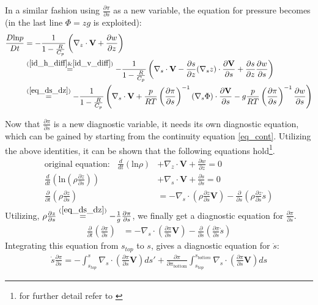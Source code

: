 In a similar fashion using $\frac{\partial \pi}{\partial s}$ as a new variable, the equation for pressure becomes (in the last line $\Phi = zg$ is exploited):
\begin{align*}
\frac{D\text{ln}p}{Dt} &= -\frac{1}{1- \frac{R}{C_p}} \left(\nabla_z \cdot \textbf{V} + \frac{\partial w}{\partial z}\right)\\
&\stackrel{(\ref{id_h_diff} \& \ref{id_v_diff})}{=} -\frac{1}{1- \frac{R}{C_p}} \left(\nabla _s \cdot \textbf{V} - \frac{\partial s}{\partial z} (\nabla _sz)\cdot \frac{\partial \textbf{V}}{\partial s} + \frac{\partial s}{\partial z}\frac{\partial w}{\partial s}\right)\\
&\stackrel{(\ref{eq_ds_dz})}{=} -\frac{1}{1- \frac{R}{C_p}} \left(\nabla _s \cdot \textbf{V} + \frac{p}{RT}\left(\frac{\partial \pi}{\partial s}\right)^{-1} (\nabla _s \Phi)\cdot\frac{\partial \textbf{V}}{\partial s} - g\frac{p}{RT}\left(\frac{\partial \pi}{\partial s}\right)^{-1} \frac{\partial w}{\partial s}\right)\\
\end{align*}

Now that $\frac{\partial \pi}{\partial s}$ is a new diagnostic variable, it needs its own diagnostic equation, which can be gained by starting from the continuity equation \ref{eq_cont}.
Utilizing the above identities, it can be shown that the following equations hold\footnote{for further detail refer to \cite{coiffier2011fundamentals}}.
\begin{align*}
\text{original equation:}~~~~ \frac{d}{dt}\left(\text{ln}\rho\right) &+ \nabla _z \cdot \textbf{V} + \frac{\partial w}{\partial z} = 0 \\
\frac{d}{dt}\left(\text{ln}\left(\rho\frac{\partial z}{\partial s}\right)\right) &+ \nabla _s \cdot \textbf{V} + \frac{\partial \dot{s}}{\partial s} = 0\\
\frac{\partial}{\partial t}\left(\rho\frac{\partial z}{\partial s}\right) &= - \nabla _s \cdot \left(\rho\frac{\partial z}{\partial s}\textbf{V}\right) - \frac{\partial }{\partial s}\left(\rho\frac{\partial z}{\partial s}\dot{s}\right)
\end{align*}
Utilizing, $\rho\frac{\partial z}{\partial s} \stackrel{(\ref{eq_ds_dz})}{=} - \frac{1}{g}\frac{\partial \pi}{\partial s}$, we finally get a diagnostic equation for $\frac{\partial \pi}{\partial s}$.
\begin{align*}
\frac{\partial}{\partial t}\left(\frac{\partial \pi}{\partial s}\right) &= - \nabla _s \cdot \left(\frac{\partial \pi}{\partial s}\textbf{V}\right) - \frac{\partial }{\partial s}\left(\frac{\partial \pi}{\partial s}\dot{s}\right)
\end{align*}
Integrating this equation from $s_{top}$ to $s$, gives a diagnostic equation for $\dot{s}$:
\begin{align*}
\dot{s}\frac{\partial \pi}{\partial s} = -\int _{s_{top}}^s\nabla _s \cdot \left(\frac{\partial \pi}{\partial s}\textbf{V}\right)ds' + \frac{\partial \pi}{\partial \pi_{\text{bottom}}} \int  _{s_{top}}^{s_{bottom}} \nabla _s \cdot \left(\frac{\partial \pi}{\partial s}\textbf{V}\right) ds
\end{align*}

